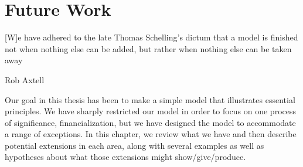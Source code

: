 \chapter[Future Work]{Future Work} \label{appendix-future-work}

\epigraph{[W]e have adhered to the late Thomas Schelling’s dictum that a model is finished not when nothing else can be added, but rather when nothing else can be taken away}{Rob Axtell \cite{axtellDynamicsFirmsData2024}}


Our goal in this thesis has been to make a simple model that illustrates essential principles. %
We have sharply restricted our model  in order to focus on one process of significance, financialization, but we have designed the model to accommodate a range of exceptions.  In this chapter, we review what we have and then describe potential extensions in each area, along with several examples as well as hypotheses about what those extensions might show/give/produce. 






